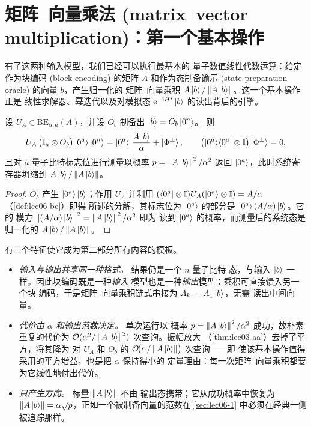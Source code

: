 \section{矩阵–向量乘法 (matrix--vector multiplication)：第一个基本操作}
\label{sec:lec06-matvec}

有了这两种输入模型，我们已经可以执行最基本的
量子数值线性代数运算：给定作为块编码 (block encoding) 的矩阵 $A$
和作为态制备谕示 (state-preparation oracle) 的向量 $b$，产生归一化的
矩阵–向量乘积 $A\ket{b}/\left\lVert A\ket{b} \right\rVert$。这一个基本操作正是
线性求解器、幂迭代以及对模拟态
$\mathrm{e}^{-\mathrm{i} Ht}\ket{b}$ 的读出背后的引擎。

\begin{proposition}[将块编码作用于一个态]
\label{prop:lec06-matvec}
设 $U_A\in\mathrm{BE}_{\alpha,a}(A)$，并设 $O_b$ 制备出 $\ket{b}=O_b\ket{0^n}$。
则
\[
  U_A\,\bigl(\mathbb{I}_a\otimes O_b\bigr)\ket{0^a}\ket{0^n}
  =\ket{0^a}\,\frac{A\ket{b}}{\alpha}+\ket{\Phi^{\perp}},
  \qquad \bigl(\ket{0^a}\!\bra{0^a}\otimes\mathbb{I}\bigr)\ket{\Phi^{\perp}}=0,
\]
且对 $a$ 量子比特标志位进行测量以概率
$p=\left\lVert A\ket{b} \right\rVert^2/\alpha^2$ 返回 $\ket{0^a}$，此时系统寄存器坍缩到
$A\ket{b}/\left\lVert A\ket{b} \right\rVert$。
\end{proposition}

\begin{proof}
$O_b$ 产生 $\ket{0^a}\ket{b}$；作用 $U_A$ 并利用
$(\bra{0^a}\otimes\mathbb{I})U_A(\ket{0^a}\otimes\mathbb{I})=A/\alpha$（\cref{def:lec06-be}）即得
所述的分解，其标志位为 $\ket{0^a}$ 的部分是 $\ket{0^a}(A/\alpha)\ket{b}$。它的
模方 $\left\lVert (A/\alpha)\ket{b} \right\rVert^2=\left\lVert A\ket{b} \right\rVert^2/\alpha^2$ 即为
读到 $\ket{0^a}$ 的概率，而测量后的系统态是
归一化的 $A\ket{b}/\left\lVert A\ket{b} \right\rVert$。
\end{proof}

有三个特征使它成为第二部分所有内容的模板。
\begin{itemize}[leftmargin=1.4em,nosep]
  \item \emph{输入与输出共享同一种格式。} 结果仍是一个 $n$ 量子比特
        态，与输入 $\ket{b}$ 一样。因此块编码既是一种\emph{输入}
        模型也是一种\emph{输出}模型：乘积可直接馈入另一个块
        编码，于是矩阵–向量乘积链式串接为 $A_k\cdots A_1\ket{b}$，无需
        读出中间向量。
  \item \emph{代价由 $\alpha$ 和输出范数决定。} 单次运行以
        概率 $p=\left\lVert A\ket{b} \right\rVert^2/\alpha^2$ 成功，故朴素重复的代价为
        $\mathcal{O}(\alpha^2/\left\lVert A\ket{b} \right\rVert^2)$ 次查询。振幅放大
        （\cref{thm:lec03-aa}）去掉了平方，将其降为
        对 $U_A$ 和 $O_b$ 的 $\mathcal{O}\!\bigl(\alpha/\left\lVert A\ket{b} \right\rVert\bigr)$ 次查询——即
        使该基本操作值得采用的平方增益，也是把 $\alpha$ 保持得小的
        定量理由：每一次矩阵–向量乘积都要为它线性地付出代价。
  \item \emph{只产生方向。} 标量 $\left\lVert A\ket{b} \right\rVert$ 不由
        输出态携带；它从成功概率中恢复为
        $\left\lVert A\ket{b} \right\rVert=\alpha\sqrt p$，正如一个被制备向量的范数在
        \cref{sec:lec06-1} 中必须在经典一侧被追踪那样。
\end{itemize}

